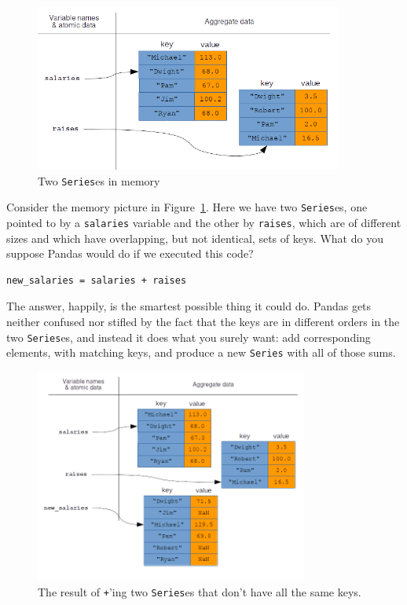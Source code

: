 \begin{figure}[ht]
\centering
\includegraphics[width=0.9\textwidth]{vectorizedPandas.png}
\caption{Two \texttt{Series}es in memory}
\label{fig:vectorizedPandas}
\end{figure}

Consider the memory picture in Figure~\ref{fig:vectorizedPandas}. Here we have
two \texttt{Series}es, one pointed to by a \texttt{salaries} variable and the
other by \texttt{raises}, which are of different sizes and which have
overlapping, but not identical, sets of keys. What do you suppose Pandas would
do if we executed this code?

\begin{Verbatim}[fontsize=\small,samepage=true,frame=single,framesep=3mm]
new_salaries = salaries + raises
\end{Verbatim}

The answer, happily, is the smartest possible thing it could do. Pandas gets
neither confused nor stifled by the fact that the keys are in different orders
in the two \texttt{Series}es, and instead it does what you surely want:
add corresponding elements, with matching keys, and produce a new
\texttt{Series} with all of those sums.

\begin{figure}[ht]
\centering
\includegraphics[width=0.8\textwidth]{vectorizedPandas2.png}
\caption{The result of \texttt{+}'ing two \texttt{Series}es that don't have all the same keys.}
\label{fig:vectorizedPandas2}
\end{figure}

